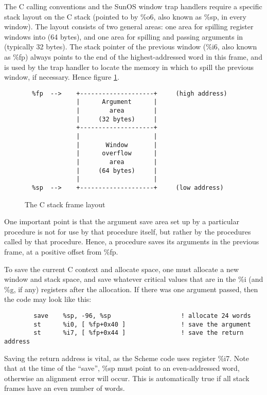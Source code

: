 The C calling conventions and the SunOS window trap handlers require a
specific stack layout on the C stack (pointed to by \%o6, also known as
\%sp, in every window). The layout consists of two general areas: one
area for spilling register windows into (64 bytes), and one area for
spilling and passing arguments in (typically 32 bytes). The stack
pointer of the previous window (\%i6, also known as \%fp) always points
to the end of the highest-addressed word in this frame, and is used by
the trap handler to locate the memory in which to spill the previous
window, if necessary. Hence figure \ref{c-args}.

\begin{figure}[hbt]
\begin{verbatim}
  %fp  -->    +--------------------+     (high address)
              |      Argument      |
              |        area        |
              |     (32 bytes)     |
              +--------------------+
              |                    |
              |       Window       |
              |      overflow      |
              |        area        |
              |     (64 bytes)     |
              |                    |
  %sp  -->    +--------------------+     (low address)
\end{verbatim}
\caption{The C stack frame layout}
\label{c-args}
\end{figure}

One important point is that the argument save area set up by a particular
procedure is not for use by that procedure itself, but rather by the
procedures called by that procedure. Hence, a procedure saves its arguments
in the previous frame, at a positive offset from \%fp.

To save the current C context and allocate space, one must allocate a
new window and stack space, and save whatever critical values that are
in the \%i (and \%g, if any) registers after the allocation. If there
was one argument passed, then the code may look like this:

\begin{verbatim}
        save    %sp, -96, %sp                   ! allocate 24 words
        st      %i0, [ %fp+0x40 ]               ! save the argument
        st      %i7, [ %fp+0x44 ]               ! save the return address
\end{verbatim}

Saving the return address is vital, as the Scheme code uses register \%i7.
Note that at the time of the ``save'', \%sp must point to an even-addressed
word, otherwise an alignment error will occur. This is automatically true
if all stack frames have an even number of words.


